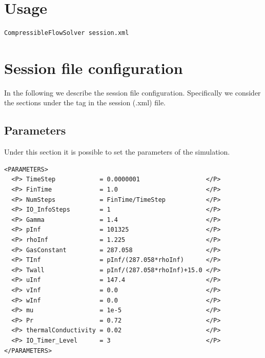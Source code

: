 \section{Usage}
\begin{lstlisting}[style=BashInputStyle]
CompressibleFlowSolver session.xml
\end{lstlisting}


\section{Session file configuration}
\label{sec:sessionFileComp}
In the following we describe the session file configuration. Specifically we consider the
sections under the tag  in the session (.xml) file.
\subsection*{Parameters}
Under this section it is possible to set the parameters of the simulation.
\begin{lstlisting}[style=XmlStyle]
<PARAMETERS>
  <P> TimeStep            = 0.0000001                  </P>
  <P> FinTime             = 1.0                        </P>
  <P> NumSteps            = FinTime/TimeStep           </P>
  <P> IO_InfoSteps        = 1                          </P>
  <P> Gamma               = 1.4                        </P>
  <P> pInf                = 101325                     </P>
  <P> rhoInf              = 1.225                      </P>
  <P> GasConstant         = 287.058                    </P>
  <P> TInf                = pInf/(287.058*rhoInf)      </P>
  <P> Twall               = pInf/(287.058*rhoInf)+15.0 </P>
  <P> uInf                = 147.4                      </P>
  <P> vInf                = 0.0                        </P>
  <P> wInf                = 0.0                        </P>
  <P> mu                  = 1e-5                       </P>
  <P> Pr                  = 0.72                       </P>
  <P> thermalConductivity = 0.02                       </P>
  <P> IO_Timer_Level      = 3                          </P>
</PARAMETERS>
\end{lstlisting}
